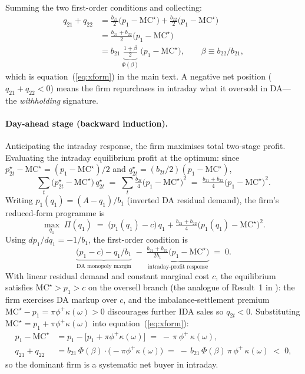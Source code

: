 \documentclass[11pt,a4paper]{article}
\begin{document}
Summing the two first-order conditions and collecting:
\begin{align*}
q_{21}+q_{22}
  &= \tfrac{b_{21}}{2}\bigl(p_1-\mathrm{MC}^\star\bigr)
     + \tfrac{b_{22}}{2}\bigl(p_1-\mathrm{MC}^\star\bigr) \\
  &= \tfrac{b_{21}+b_{22}}{2}\bigl(p_1-\mathrm{MC}^\star\bigr) \\
  &= b_{21}\,\underbrace{\tfrac{1+\beta}{2}}_{\Phi(\beta)}\,
     \bigl(p_1-\mathrm{MC}^\star\bigr),
\qquad \beta \equiv b_{22}/b_{21},
\end{align*}
which is equation~(\ref{eq:xform}) in the main text. A negative net
position ($q_{21}+q_{22}<0$) means the firm repurchases in intraday
what it oversold in DA---the \citet{ito2016} \emph{withholding}
signature.

\paragraph{Day-ahead stage (backward induction).} Anticipating the
intraday response, the firm maximises total two-stage profit. Evaluating
the intraday equilibrium profit at the optimum: since
$p_{2t}^\star - \mathrm{MC}^\star = (p_1-\mathrm{MC}^\star)/2$ and
$q_{2t}^\star = (b_{2t}/2)(p_1-\mathrm{MC}^\star)$,
\[
\sum_{t}\!\bigl(p_{2t}^\star-\mathrm{MC}^\star\bigr)\,q_{2t}^\star
  \;=\; \sum_t \tfrac{b_{2t}}{4}\bigl(p_1-\mathrm{MC}^\star\bigr)^2
  \;=\; \tfrac{b_{21}+b_{22}}{4}\bigl(p_1-\mathrm{MC}^\star\bigr)^2.
\]
Writing $p_1(q_1) = (A-q_1)/b_1$ (inverted DA residual demand), the
firm's reduced-form programme is
\[
\max_{q_1}\;\Pi(q_1)
\;=\; \bigl(p_1(q_1)-c\bigr)\,q_1
  + \tfrac{b_{21}+b_{22}}{4}\bigl(p_1(q_1)-\mathrm{MC}^\star\bigr)^2.
\]
Using $dp_1/dq_1 = -1/b_1$, the first-order condition is
\[
\underbrace{\bigl(p_1-c\bigr) - q_1/b_1}_{\text{DA monopoly margin}}
  \;-\; \underbrace{\tfrac{b_{21}+b_{22}}{2 b_1}\bigl(p_1-\mathrm{MC}^\star\bigr)}_{\text{intraday-profit response}}
  \;=\; 0.
\]
With linear residual demand and constant marginal cost $c$, the
equilibrium satisfies $\mathrm{MC}^\star > p_1 > c$ on the oversell
branch (the analogue of Result~1 in \citealt{ito2016}): the firm
exercises DA markup over $c$, and the imbalance-settlement premium
$\mathrm{MC}^\star - p_1 = \pi\phi^+\kappa(\omega) > 0$ discourages
further IDA sales so $q_{2t}<0$. Substituting
$\mathrm{MC}^\star = p_1 + \pi\phi^+\kappa(\omega)$ into
equation~(\ref{eq:xform}):
\begin{align*}
p_1 - \mathrm{MC}^\star
  &= p_1 - \bigl[p_1 + \pi\phi^+\kappa(\omega)\bigr]
  \;=\; -\,\pi\,\phi^+\,\kappa(\omega),\\[2pt]
q_{21}+q_{22}
  &= b_{21}\,\Phi(\beta)\cdot\bigl(-\pi\phi^+\kappa(\omega)\bigr)
  \;=\; -\,b_{21}\,\Phi(\beta)\,\pi\,\phi^+\,\kappa(\omega) \;<\; 0,
\end{align*}
so the dominant firm is a systematic net buyer in intraday.
\end{document}
